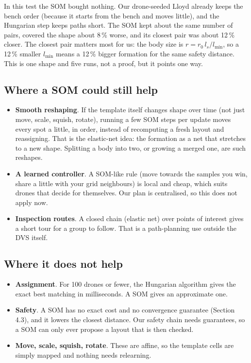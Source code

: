 \documentclass[11pt,a4paper]{article}
\begin{document}
\begin{oursbox}
In this test the SOM bought nothing. Our drone-seeded Lloyd already keeps the bench order (because it starts from
the bench and moves little), and the Hungarian step keeps paths short. The SOM kept about the same number of pairs,
covered the shape about 8\,\% worse, and its closest pair was about 12\,\% closer. The closest pair matters most for
us: the body size is $r=r_0\,l_s/l_{\min}$, so a 12\,\% smaller $l_{\min}$ means a 12\,\% bigger formation for the
same safety distance. This is one shape and five runs, not a proof, but it points one way.
\end{oursbox}

\subsection{Where a SOM could still help}
\begin{itemize}[leftmargin=*]
\item \textbf{Smooth reshaping}. If the template itself changes shape over time (not just move, scale, squish, rotate),
running a few SOM steps per update moves every spot a little, in order, instead of recomputing a fresh layout and
reassigning. That is the elastic-net idea: the formation as a net that stretches to a new shape. Splitting a body into
two, or growing a merged one, are such reshapes.
\item \textbf{A learned controller}. A SOM-like rule (move towards the samples you win, share a little with your grid
neighbours) is local and cheap, which suits drones that decide for themselves. Our plan is centralised, so this does
not apply now.
\item \textbf{Inspection routes}. A closed chain (elastic net) over points of interest gives a short tour for a
group to follow. That is a path-planning use outside the DVS itself.
\end{itemize}

\subsection{Where it does not help}
\begin{itemize}[leftmargin=*]
\item \textbf{Assignment}. For 100 drones or fewer, the Hungarian algorithm gives the exact best matching in
milliseconds. A SOM gives an approximate one.
\item \textbf{Safety}. A SOM has no exact cost and no convergence guarantee (Section 4.3), and it lowers the closest
distance. Our safety chain needs guarantees, so a SOM can only ever propose a layout that is then checked.
\item \textbf{Move, scale, squish, rotate}. These are affine, so the template cells are simply mapped and nothing
needs relearning.
\end{itemize}
\end{document}
